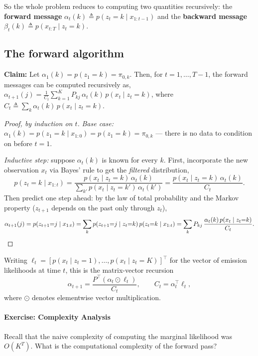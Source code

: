\documentclass[11pt]{article}
\begin{document}
So the whole problem reduces to computing two quantities recursively: the
\textbf{forward message} $\alpha_t(k) \triangleq p(z_t{=}k\mid x_{1:t-1})$
and the \textbf{backward message} $\beta_t(k) \triangleq p(x_{t:T}\mid
z_t{=}k)$.

\subsection{The forward algorithm}

\textbf{Claim:} Let $\alpha_1(k) = p(z_1=k) = \pi_{0,k}$. Then, for $t=1,\ldots,T-1$, the forward messages can be computed recursively as, $\displaystyle \alpha_{t+1}(j) = \frac{1}{C_t}\sum_{k=1}^K
P_{kj}\, \alpha_t(k)\, p(x_t\mid z_t{=}k)$, where $C_t \triangleq \sum_k \alpha_t(k)\, p(x_t\mid z_t{=}k)$.

\begin{proof}[Proof, by induction on $t$]
\textit{Base case:} $\alpha_1(k) = p(z_1{=}k\mid x_{1:0}) = p(z_1{=}k) =
\pi_{0,k}$ --- there is no data to condition on before $t=1$.

\textit{Inductive step:} suppose $\alpha_t(k)$ is known for every $k$.
First, incorporate the new observation $x_t$ via Bayes' rule to get the
\emph{filtered} distribution,
\[
p(z_t{=}k \mid x_{1:t}) = \frac{p(x_t\mid z_t{=}k)\,\alpha_t(k)}
{\sum_{k'} p(x_t\mid z_t{=}k')\,\alpha_t(k')}
= \frac{p(x_t\mid z_t{=}k)\,\alpha_t(k)}{C_t}.
\]
Then predict one step ahead: by the law of total probability and the
Markov property ($z_{t+1}$ depends on the past only through $z_t$),
\[
\alpha_{t+1}(j) = p(z_{t+1}{=}j\mid x_{1:t})
= \sum_k p(z_{t+1}{=}j\mid z_t{=}k)\, p(z_t{=}k\mid x_{1:t})
= \sum_k P_{kj}\, \frac{\alpha_t(k)\, p(x_t\mid z_t{=}k)}{C_t}. \qedhere
\]
\end{proof}

Writing $\ell_t = [p(x_t\mid z_t{=}1),\ldots,p(x_t\mid z_t{=}K)]^\top$
for the vector of emission likelihoods at time $t$, this is the matrix-vector
recursion
\begin{equation}
\alpha_{t+1} = \frac{P^\top(\alpha_t \odot \ell_t)}{C_t},
\qquad C_t = \alpha_{t}^\top \ell_{t},
\label{eq:forward-recursion}
\end{equation}
where $\odot$ denotes elementwise vector multiplication.

\paragraph{Exercise: Complexity Analysis}
Recall that the naive complexity of computing the marginal likelihood was $O(K^T)$. 
What is the computational complexity of the forward pass?
\end{document}

